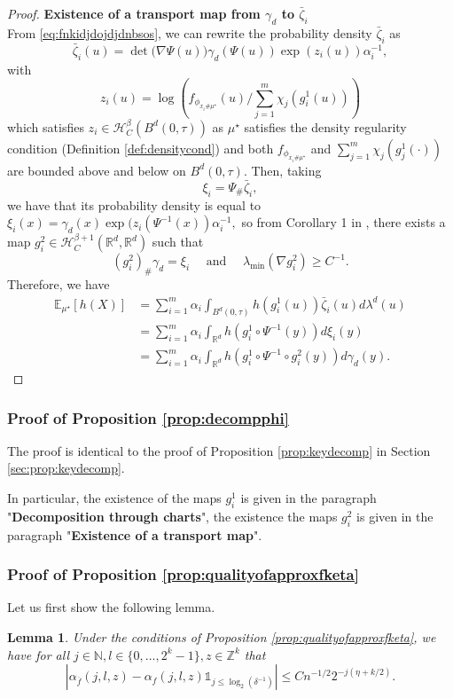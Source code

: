 \documentclass[10pt]{article}
\newtheorem{lemma}{Lemma}
\begin{document}
\begin{proof}
\textbf{Existence of a transport map from $\gamma_d$ to $\bar{\zeta}_i$}\\
From \eqref{eq:fnkidjdojdjdnbsos}, we can rewrite the probability density $\bar{\zeta}_i$ as
$$\bar{\zeta}_i(u)=\det\big(\nabla \Psi(u)\big)\gamma_d( \Psi(u))\exp(z_i(u))\alpha_i^{-1},$$
with
$$
z_i(u)=\log\left(f_{\phi_{x_i\# \mu^\star}}(u)/\sum_{j=1}^m\chi_j(g_i^1(u))\right)
$$
which satisfies $z_i\in \mathcal{H}^\beta_C(B^d(0,\tau))$ as $\mu^\star$ satisfies the density regularity condition (Definition \ref{def:densitycond}) and both $f_{\phi_{x_i\# \mu^\star}}$ and $\sum_{j=1}^m\chi_j(g_j^1(\cdot))$ are bounded above and below on $B^d(0,\tau)$. 
 Then, taking $$\xi_i=\Psi_{\#} \bar{\zeta}_i,$$ we have that its probability density is equal to
$\xi_i(x)=\gamma_d(x)\exp(z_i(\Psi^{-1}(x))\alpha_i^{-1},$
so from Corollary 1 in \cite{stephanovitch2024smooth}, there exists a map $g_i^2\in \mathcal{H}^{\beta+1}_C(\mathbb{R}^d, \mathbb{R}^d)$  such that $$(g_i^2)_{\# }\gamma_d=\xi_i\quad \text{ and }\quad \lambda_{\min}(\nabla g_i^2)\geq C^{-1}.$$ Therefore, we have
\begin{align*}
 \mathbb{E}_{\mu^\star}[h(X)]&=\sum \limits_{i=1}^m \alpha_i\int_{B^d(0,\tau)}h(g_i^1(u))\bar{\zeta}_i(u)d\lambda^d(u)\\
 &=\sum \limits_{i=1}^m \alpha_i\int_{\mathbb{R}^d}h(g_i^1\circ \Psi^{-1}(y))d\xi_i(y)\\
&=\sum \limits_{i=1}^m\alpha_i\int_{\mathbb{R}^d} h(g_i^1\circ \Psi^{-1}\circ g_i^2(y))d\gamma_d(y).
\end{align*}
\end{proof}

\subsubsection{Proof of Proposition \ref{prop:decompphi}}\label{sec:prop:decompphi}
The proof is identical to the proof of Proposition \ref{prop:keydecomp} in Section \ref{sec:prop:keydecomp}. 

In particular,
the existence of the maps $g_i^{1}$ is given in the paragraph "\textbf{Decomposition through charts}", the existence the maps $g_i^{2}$ is given in the paragraph "\textbf{Existence of a transport map}".

\subsubsection{Proof of Proposition \ref{prop:qualityofapproxfketa}}\label{sec:prop:qualityofapproxfketa}
Let us first show the following lemma.
\begin{lemma}\label{lemma:bouundcoefwav}
    Under the conditions of Proposition \ref{prop:qualityofapproxfketa}, we have for all
    $j\in \mathbb{N},l\in \{0,...,2^k-1\},z\in \mathbb{Z}^k$ that 
$$
|\alpha_{\overline{f}}(j,l,z)-\alpha_{f}(j,l,z)\mathds{1}_{j\leq \log_2(\delta^{-1})}|\leq Cn^{-1/2}2^{-j(\eta+k/2)}.
$$

\end{lemma}
\end{document}
